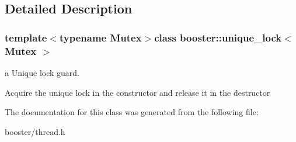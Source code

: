 \subsection{\-Detailed \-Description}
\subsubsection*{template$<$typename \-Mutex$>$class booster\-::unique\-\_\-lock$<$ Mutex $>$}

a \-Unique lock guard. 

\-Acquire the unique lock in the constructor and release it in the destructor 

\-The documentation for this class was generated from the following file\-:\begin{DoxyCompactItemize}
\item 
booster/thread.\-h\end{DoxyCompactItemize}
